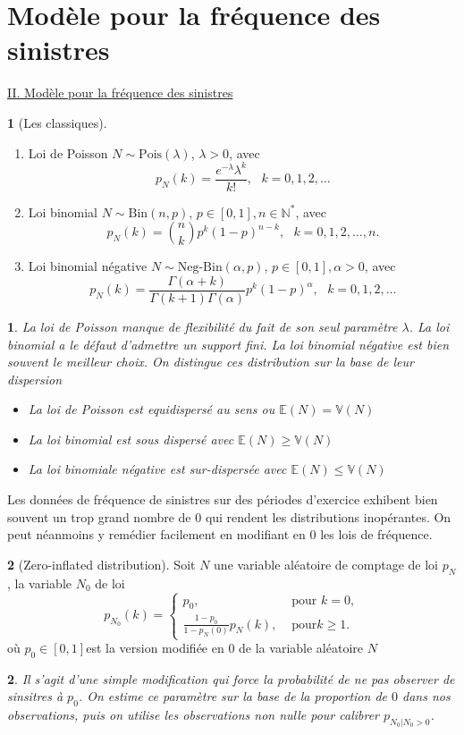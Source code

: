 \documentclass[8pt,notheorems]{beamer}
\def \E{\mathbb E}
\def \N{\mathbb N}
\def \V{\mathbb V}
\newtheorem{remark}{\translate{Remark}}
\theoremstyle{definition}
\newtheorem{definition}{\translate{Definition}}
\theoremstyle{example}
\theoremstyle{mystyle}
\theoremstyle{plain}
\begin{document}
\section{Modèle pour la fréquence des sinistres}
\begin{frame}[allowframebreaks]
\underline{II. Modèle pour la fréquence des sinistres}
\begin{definition}[Les classiques]
\begin{enumerate}
    \item Loi de Poisson $N\sim\text{Pois}(\lambda)$, $\lambda>0$, avec
    $$
    p_N(k) = \frac{e^{-\lambda}\lambda^k}{k!},\text{ }k = 0,1,2,\ldots
    $$
    \item Loi binomial $N\sim\text{Bin}(n,p)$, $p\in[0,1], n\in\N^\ast$, avec
    $$
    p_N(k) = \binom{n}{k}p^k(1-p)^{n-k},\text{ }k = 0,1,2,\ldots,n.
    $$
    \item Loi binomial négative $N\sim\text{Neg-Bin}(\alpha,p)$, $p\in[0,1], \alpha>0$, avec
    $$
    p_N(k) = \frac{\Gamma(\alpha+k)}{\Gamma(k+1)\Gamma(\alpha)}p^k(1-p)^{\alpha},\text{ }k = 0,1,2,\ldots
    $$
\end{enumerate}
\end{definition}
\begin{remark}
La loi de Poisson manque de flexibilité du fait de son seul paramètre $\lambda$. La loi binomial a le défaut d'admettre un support fini. La loi binomial négative est bien souvent le meilleur choix. On distingue ces distribution sur la base de leur dispersion
 \begin{itemize}
    \item La loi de Poisson est equidispersé au sens ou $\E(N)= \V(N)$
    \item La loi binomial est sous dispersé avec $\E(N)\geq \V(N)$
    \item La loi binomiale négative est sur-dispersée avec $\E(N)\leq \V(N)$
 \end{itemize}
\end{remark}
Les données de fréquence de sinistres sur des périodes d'exercice exhibent bien souvent un trop grand nombre de $0$ qui rendent les distributions inopérantes. On peut néanmoins y remédier facilement en modifiant en $0$ les lois de fréquence.
\begin{definition}[Zero-inflated distribution]
Soit $N$ une variable aléatoire de comptage de loi $p_N$, la variable $N_0$ de loi
$$
p_{N_0}(k) = \begin{cases}
p_0,&\text{ pour }k = 0,\\
\frac{1-p_0}{1-p_N(0)}p_N(k),&\text{ pour}k\geq1.
\end{cases}
$$
où $p_0\in[0,1]$est la version modifiée en $0$ de la variable aléatoire $N$
\end{definition}
\begin{remark}
Il s'agit d'une simple modification qui force la probabilité de ne pas observer de sinsitres à $p_0$. On estime ce paramètre sur la base de la proportion de $0$ dans nos observations, puis on utilise les observations non nulle pour calibrer $p_{N_{0}|N_{0}>0}$.
\end{remark}
\end{frame}
\end{document}
